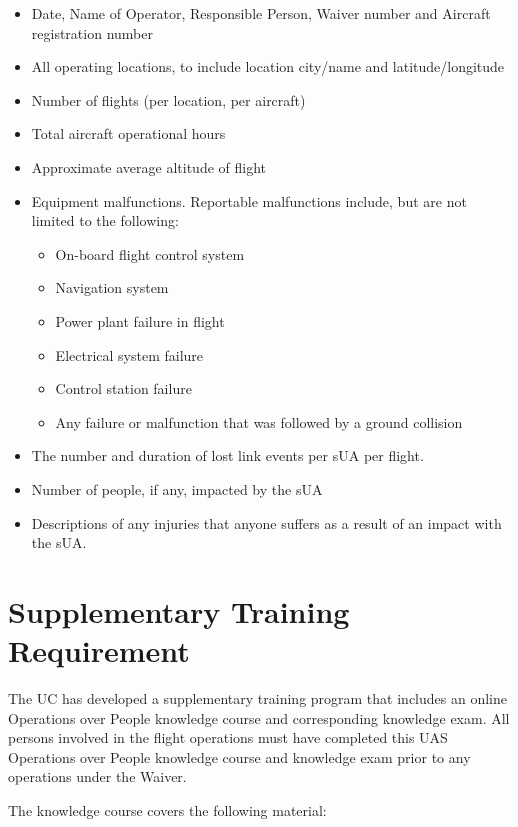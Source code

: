 \documentclass[
]{book}
\providecommand{\tightlist}{%
  \setlength{\itemsep}{0pt}\setlength{\parskip}{0pt}}
\begin{document}
\begin{itemize}
\item
  Date, Name of Operator, Responsible Person, Waiver number and Aircraft registration number
\item
  All operating locations, to include location city/name and latitude/longitude
\item
  Number of flights (per location, per aircraft)
\item
  Total aircraft operational hours
\item
  Approximate average altitude of flight
\item
  Equipment malfunctions. Reportable malfunctions include, but are not limited to the following:

  \begin{itemize}
  \tightlist
  \item
    On-board flight control system
  \item
    Navigation system
  \item
    Power plant failure in flight
  \item
    Electrical system failure
  \item
    Control station failure
  \item
    Any failure or malfunction that was followed by a ground collision
  \end{itemize}
\item
  The number and duration of lost link events per sUA per flight.
\item
  Number of people, if any, impacted by the sUA
\item
  Descriptions of any injuries that anyone suffers as a result of an impact with the sUA.
\end{itemize}

\hypertarget{s39v-tr}{%
\section{Supplementary Training Requirement}\label{s39v-tr}}

The UC has developed a supplementary training program that includes an online Operations over People knowledge course and corresponding knowledge exam. All persons involved in the flight operations must have completed this UAS Operations over People knowledge course and knowledge exam prior to any operations under the Waiver.

The knowledge course covers the following material:
\end{document}
